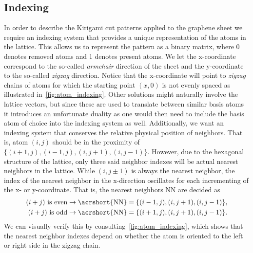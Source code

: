 \subsection{Indexing}
In order to describe the Kirigami cut patterns applied to the graphene sheet we require an indexing system that provides a unique representation of the atoms in the lattice. This allows us to represent the pattern as a binary matrix, where 0 denotes removed atoms and 1 denotes present atoms. We let the x-coordinate correspond to the so-called \textit{armchair} direction of the sheet and the y-coordinate to the so-called \textit{zigzag} direction. Notice that the x-coordinate will point to \textit{zigzag} chains of atoms for which the starting point $(x, 0)$ is not evenly spaced as illustrated in~\cref{fig:atom_indexing}. Other
solutions might naturally involve the lattice vectors, but since these are used
to translate between similar basis atoms it introduces an unfortunate duality as
one would then need to include the basis atom of choice into the indexing system
as well. Additionally, we want an indexing system that conserves the relative
physical position of neighbors. That is, atom $(i, j)$ should be in the
proximity of $\{(i+1, j), (i-1, j), (i, j+1), (i, j-1)\}$. However, due to the
hexagonal structure of the lattice, only three said neighbor indexes will be
actual nearest neighbors in the lattice. While $(i, j\pm 1)$ is always the nearest
neighbor, the index of the nearest neighbor in the x-direction oscillates for
each incrementing of the x- or y-coordinate. That is, the nearest neighbors \acrshort{NN} are decided as
\begin{equation}
  \begin{aligned}
    (i + j) \ \text{is even} &\rightarrow \text{\acrshort{NN}} = \{(i-1, j), (i, j+1), (i, j-1)\}, \\
    (i + j) \ \text{is odd} &\rightarrow \text{\acrshort{NN}} = \{(i+1, j), (i, j+1), (i, j-1)\}.
  \end{aligned}
  \label{eq:atom_neigh_idx}
\end{equation}
We can visually verify this by consulting~\cref{fig:atom_indexing}, which shows that the nearest neighbor indexes depend on whether the atom is oriented to the left or right side in the zigzag chain.

